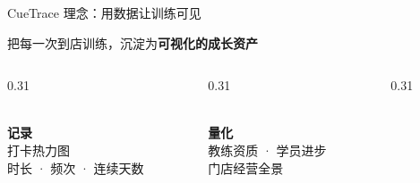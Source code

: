 \documentclass[aspectratio=169,11pt]{ctexbeamer}
\begin{document}

\begin{frame}{CueTrace 理念：用数据让训练可见}

  \vspace{0.6em}

  \begin{center}

    {\Large\color{txtmain}把每一次到店训练，沉淀为\textbf{\color{dachuanlt}可视化的成长资产}}

  \end{center}

  \vspace{1.0em}

  \begin{columns}[T]

    \begin{column}{0.31\textwidth}

      \begin{center}

        {\color{dachuan}\Huge\faFingerprint}\\[8pt]

        \textbf{记录}\\[4pt]

        {\color{txtsub}\small 打卡热力图\\时长 · 频次 · 连续天数}

      \end{center}

    \end{column}

    \begin{column}{0.31\textwidth}

      \begin{center}

        {\color{dachuan}\Huge\faChartLine}\\[8pt]

        \textbf{量化}\\[4pt]

        {\color{txtsub}\small 教练资质 · 学员进步\\门店经营全景}

      \end{center}

    \end{column}

    \begin{column}{0.31\textwidth}

      \begin{center}


\end{center}
\end{column}
\end{columns}
\end{frame}
\end{document}
